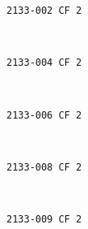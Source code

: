 \documentclass[11pt]{article}
\begin{document}
    \begin{Verbatim}[commandchars=\\\{\}]
2133-002 CF 2

    \end{Verbatim}

    \begin{center}
    \end{center}
    { \hspace*{\fill} \\}
    
    \begin{Verbatim}[commandchars=\\\{\}]
2133-004 CF 2

    \end{Verbatim}

    \begin{center}
    \end{center}
    { \hspace*{\fill} \\}
    
    \begin{Verbatim}[commandchars=\\\{\}]
2133-006 CF 2

    \end{Verbatim}

    \begin{center}
    \end{center}
    { \hspace*{\fill} \\}
    
    \begin{Verbatim}[commandchars=\\\{\}]
2133-008 CF 2

    \end{Verbatim}

    \begin{center}
    \end{center}
    { \hspace*{\fill} \\}
    
    \begin{Verbatim}[commandchars=\\\{\}]
2133-009 CF 2

    \end{Verbatim}
\end{document}
